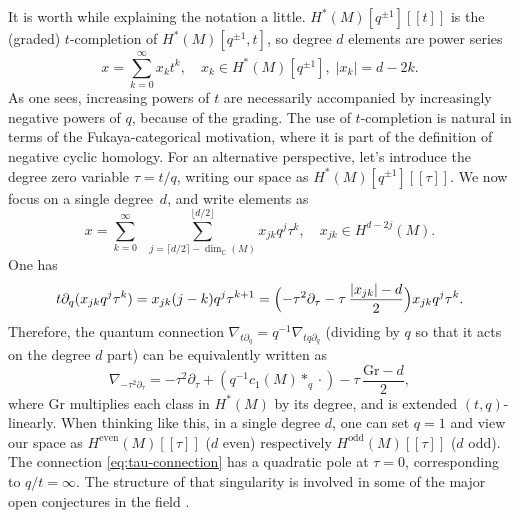 \documentclass[JEP,XML,SOM,Unicode,NoFloatCountersInSection,published]{cedram}
\newcommand{\llbracket}{[\![}
\newcommand{\rrbracket}{]\!]}
\theoremstyle{plain}
\theoremstyle{definition}
\newcommand{\bC}{{\mathbb C}}
\begin{document}
It is worth while explaining the notation a little. $H^*(M)[q^{\pm 1}]\llbracket t\rrbracket$ is the (graded) $t$-completion of $H^*(M)[q^{\pm 1},t]$, so degree $d$ elements are power series
\begin{equation*}
x = \sum_{k=0}^\infty x_k t^k, \quad x_k \in H^*(M)[q^{\pm 1}], \; |x_k| = d-2k.
\end{equation*}
As one sees, increasing powers of $t$ are necessarily accompanied by increasingly negative powers of $q$, because of the grading. The use of $t$-completion is natural in terms of the Fukaya-categorical motivation, where it is part of the definition of negative cyclic homology. For an alternative perspective, let's introduce the degree zero variable $\tau = t/q$, writing our space as $H^*(M)[q^{\pm 1}]\llbracket \tau\rrbracket$. We now focus on a single degree~$d$, and write elements as
\begin{equation*}
x = \sum_{k=0}^\infty \;\; \sum_{j = \lceil d/2 \rceil - \dim_{\bC}(M)}^{\lfloor d/2 \rfloor} x_{jk} q^j \tau^k, \quad x_{jk} \in H^{d-2j}(M).
\end{equation*}
One has
\begin{equation*}
t\partial_q (x_{jk} q^j \tau^k) = x_{jk} (j-k)q^j \tau^{k+1} = \Bigl(-\tau^2\partial_\tau - \tau\, \frac{|x_{jk}|-d}{2}\Bigr) x_{jk} q^j \tau^k.
\end{equation*}
Therefore, the quantum connection $\nabla_{t\partial_q} = q^{-1}\nabla_{tq\partial_q}$ (dividing by $q$ so that it acts on the degree $d$ part) can be equivalently written as
\begin{equation}\label{eq:tau-connection}
\nabla_{-\tau^2\partial_\tau} = -\tau^2 \partial_\tau + (q^{-1} c_1(M) \ast_q \cdot) - \tau\, \frac{\mathrm{Gr}-d}{2},
\end{equation}
where $\mathrm{Gr}$ multiplies each class in $H^*(M)$ by its degree, and is extended $(t,q)$-linearly. When thinking like this, in a single degree $d$, one can set $q = 1$ and view our space as $H^{\mathrm{even}}(M)\llbracket \tau\rrbracket$ ($d$ even) respectively $H^{\mathrm{odd}}(M)\llbracket \tau\rrbracket$ ($d$ odd). The connection \eqref{eq:tau-connection} has a quadratic pole at $\tau = 0$, corresponding to $q/t = \infty$. The structure of that singularity is involved in some of the major open conjectures in the field \cite{dubrovin98, katzarkov-kontsevich-pantev08, galkin-golyshev-iritani16}.
\end{document}
